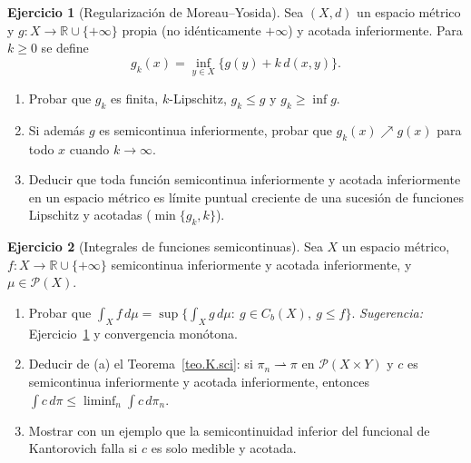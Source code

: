 \documentclass[12pt, a4paper]{amsbook}
\newcommand{\R}{{\mathbb R}}
\theoremstyle{remark}
\theoremstyle{definition}
\newtheorem{ejercicio}{Ejercicio}[chapter]
\numberwithin{section}{chapter}
\numberwithin{subsection}{section}
\numberwithin{equation}{section}
\numberwithin{figure}{chapter}
\begin{document}
\begin{ejercicio}[Regularización de Moreau--Yosida]\label{ejer.moreau.yosida}
Sea $(X,d)$ un espacio métrico y $g\colon X\to\R\cup\{+\infty\}$ propia
(no idénticamente $+\infty$) y acotada inferiormente. Para $k\ge0$ se define
\[
g_k(x)=\inf_{y\in X}\bigl\{g(y)+k\,d(x,y)\bigr\}.
\]
\begin{enumerate}[label=(\alph*)]
\item Probar que $g_k$ es finita, $k$-Lipschitz, $g_k\le g$ y $g_k\ge\inf g$.
\item Si además $g$ es semicontinua inferiormente, probar que $g_k(x)\nearrow g(x)$
para todo $x$ cuando $k\to\infty$.
\item Deducir que toda función semicontinua inferiormente y acotada
inferiormente en un espacio métrico es límite puntual creciente de una
sucesión de funciones Lipschitz y acotadas ($\min\{g_k,k\}$).
\end{enumerate}
\end{ejercicio}

\begin{ejercicio}[Integrales de funciones semicontinuas]\label{ejer.sci.integral}
Sea $X$ un espacio métrico, $f\colon X\to\R\cup\{+\infty\}$ semicontinua
inferiormente y acotada inferiormente, y $\mu\in\mathcal P(X)$.
\begin{enumerate}[label=(\alph*)]
\item Probar que
$\int_Xf\,d\mu=\sup\bigl\{\int_Xg\,d\mu:\ g\in C_b(X),\ g\le f\bigr\}$.
\emph{Sugerencia:} Ejercicio~\ref{ejer.moreau.yosida} y convergencia
monótona.
\item Deducir de (a) el Teorema~\ref{teo.K.sci}: si $\pi_n\rightharpoonup\pi$
en $\mathcal P(X\times Y)$ y $c$ es semicontinua inferiormente y acotada
inferiormente, entonces $\int c\,d\pi\le\liminf_n\int c\,d\pi_n$.
\item Mostrar con un ejemplo que la semicontinuidad inferior del funcional
de Kantorovich falla si $c$ es solo medible y acotada.
\end{enumerate}
\end{ejercicio}
\end{document}
